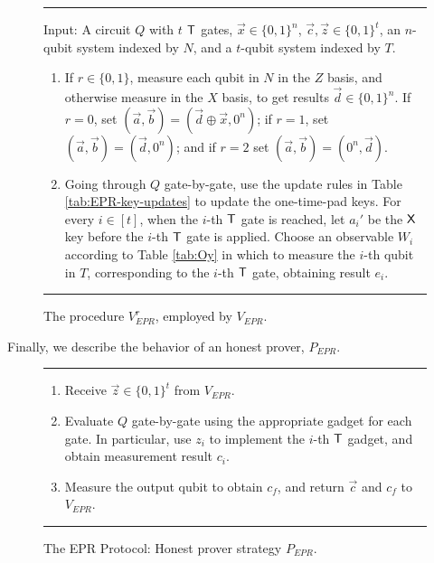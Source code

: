 \documentclass[11pt]{article}
\theoremstyle{remark}
\theoremstyle{definition}
\begin{document}
\begin{figure}[H]
\rule[1ex]{16.5cm}{0.5pt}
\raggedright
Input: A circuit $Q$ with $t$ $\sf T$ gates, $\vec{x}\in\{0,1\}^n$, $\vec{c},\vec{z}\in\{0,1\}^t$, an $n$-qubit system indexed by $N$, and a $t$-qubit system indexed by $T$.
\begin{enumerate}
\item If $r\in\{0,1\}$, measure each qubit in $N$ in the $Z$ basis, and otherwise measure in the $X$ basis, to get results $\vec{d}\in\{0,1\}^n$. If $r=0$, set $(\vec{a},\vec{b})=(\vec{d}\oplus \vec{x},0^n)$; if $r=1$, set $(\vec{a},\vec{b})=(\vec{d},0^n)$; and if $r=2$ set $(\vec{a},\vec{b})=(0^n,\vec{d})$. 
\item Going through $Q$ gate-by-gate, use the update rules in Table
  \ref{tab:EPR-key-updates} to update the one-time-pad keys. For every
    $i\in[t]$, when the $i$-th $\sf T$ gate is reached, let $a_i'$ be the $\sf
    X$ key before the $i$-th $\sf T$ gate is applied. Choose an observable $W_i$ according to Table \ref{tab:Oy} in which to measure the $i$-th qubit in $T$, corresponding to the $i$-th $\sf T$ gate, obtaining result $e_i$.  
\end{enumerate}
\rule[2ex]{16.5cm}{0.5pt}\vspace{-.5cm}
\caption{The procedure $V_{EPR}^r$, employed by $V_{EPR}$.}
  \label{fig:original-protocol-VEPRr}
\end{figure}

\noindent Finally, we describe the behavior of an honest prover, $P_{EPR}$.

\begin{figure}[H]
\rule[1ex]{16.5cm}{0.5pt}
\begin{enumerate}
\item Receive $\vec{z}\in\{0,1\}^t$ from $V_{EPR}$. 
\item Evaluate $Q$ gate-by-gate using the appropriate gadget for each gate.
In particular, use $z_i$ to implement the $i$-th $\sf T$ gadget, and obtain measurement result $c_i$. 
\item Measure the output qubit to obtain $c_f$, and return $\vec{c}$ and $c_f$ to $V_{EPR}$.
\end{enumerate}
\rule[2ex]{16.5cm}{0.5pt}\vspace{-.5cm}
\caption{The EPR Protocol: Honest prover strategy $P_{EPR}$.}
  \label{fig:original-protocol-PEPR}
\end{figure}
\end{document}

